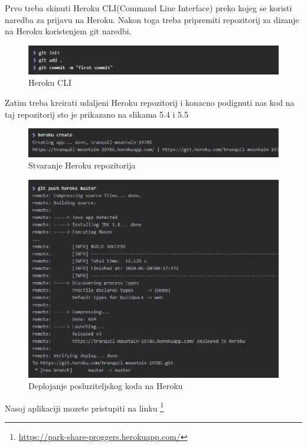 	Prvo treba skinuti Heroku CLI(Command Line Interface) preko kojeg se koristi naredba za prijavu na Heroku. 
	Nakon toga treba pripremiti repozitorij za dizanje na Heroku koristenjem git naredbi.
	
		\begin{figure}[H]
		
		\includegraphics[width=\textwidth]{slike/druga.jpg} %
		\centering
		\caption{Heroku CLI}
		\label{fig:cli}
	\end{figure}
Zatim treba kreirati udaljeni Heroku repozitorij i konacno podignuti nas kod na taj repozitorij sto je prikazano na slikama 5.4 i 5.5
	\begin{figure}[H]
	
	\includegraphics[width=\textwidth]{slike/treca.jpg} %
	\centering
	\caption{Stvaranje Heroku repozitorija}
	\label{fig:tre}
\end{figure}
\begin{figure}[H]
	
	\includegraphics[width=\textwidth]{slike/cetvrta.jpg} %
	\centering
	\caption{Deplojanje posluziteljskog koda na Heroku}
	\label{fig:cli}
\end{figure}
Nasoj aplikaciji mozete pristupiti na linku \footnote{\url{https://park-share-proggers.herokuapp.com/}}
		
			\eject 